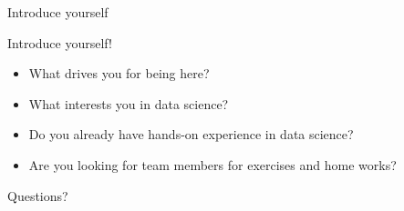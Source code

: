 \documentclass[aspectratio=169]{../latex_main/tntbeamer}  %
\begin{document}
\begin{frame}[c]{Introduce yourself}


\begin{center}
\huge
    Introduce yourself!
\end{center}

\begin{itemize}
    \item What drives you for being here?
    \item What interests you in data science?
    \item Do you already have hands-on experience in data science?
    \item Are you looking for team members for exercises and home works?
\end{itemize}

\end{frame}


\begin{frame}[c]{}

\centering
\huge
Questions?

\end{frame}

	
\end{document}
